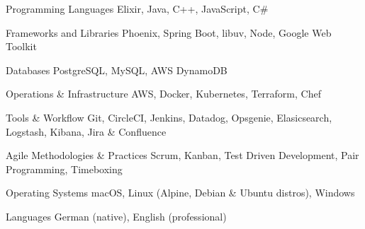 

\begin{cvskills}

  \cvskill
    {Programming Languages} %
    {Elixir, Java, C++, JavaScript, C\#} %
  
  \cvskill
    {Frameworks and Libraries} %
    {Phoenix, Spring Boot, libuv, Node, Google Web Toolkit} %
  
  \cvskill
    {Databases} %
    {PostgreSQL, MySQL, AWS DynamoDB} %

  \cvskill
    {Operations \& Infrastructure} %
    {AWS, Docker, Kubernetes, Terraform, Chef} %

  \cvskill
    {Tools \& Workflow} %
    {Git, CircleCI, Jenkins, Datadog, Opsgenie, Elasicsearch, Logstash, Kibana, Jira \& Confluence} %

  \cvskill
    {Agile Methodologies \& Practices} %
    {Scrum, Kanban, Test Driven Development, Pair Programming, Timeboxing} %

  \cvskill
    {Operating Systems} %
    {macOS, Linux (Alpine, Debian \& Ubuntu distros), Windows} %

  \cvskill
    {Languages} %
    {German (native), English (professional)} %

\end{cvskills}
